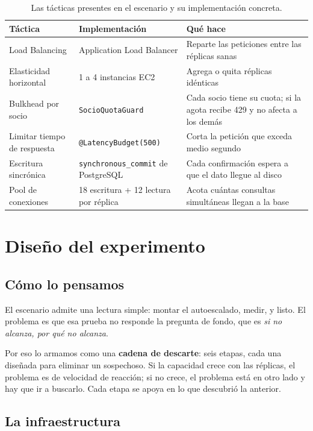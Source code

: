 \documentclass[11pt]{article}
\begin{document}
\begin{table}[H]
\centering
\begin{tabular}{L{3.6cm} L{5.2cm} L{7cm}}
\toprule
Táctica & Implementación & Qué hace \\
\midrule
Load Balancing & Application Load Balancer & Reparte las peticiones entre las réplicas sanas \\
Elasticidad horizontal & 1 a 4 instancias EC2 & Agrega o quita réplicas idénticas \\
Bulkhead por socio & \texttt{SocioQuotaGuard} & Cada socio tiene su cuota; si la agota recibe 429 y no afecta a los demás \\
Limitar tiempo de respuesta & \texttt{@LatencyBudget(500)} & Corta la petición que exceda medio segundo \\
Escritura sincrónica & \texttt{synchronous\_commit} de PostgreSQL & Cada confirmación espera a que el dato llegue al disco \\
Pool de conexiones & 18 escritura + 12 lectura por réplica & Acota cuántas consultas simultáneas llegan a la base \\
\bottomrule
\end{tabular}
\caption{Las tácticas presentes en el escenario y su implementación concreta.}
\end{table}

\section{Diseño del experimento}

\subsection{Cómo lo pensamos}

El escenario admite una lectura simple: montar el autoescalado, medir, y listo. El problema es que
esa prueba no responde la pregunta de fondo, que es \textit{si no alcanza, por qué no alcanza}.

Por eso lo armamos como una \textbf{cadena de descarte}: seis etapas, cada una diseñada para
eliminar un sospechoso. Si la capacidad crece con las réplicas, el problema es de velocidad de
reacción; si no crece, el problema está en otro lado y hay que ir a buscarlo. Cada etapa se apoya en
lo que descubrió la anterior.

\subsection{La infraestructura}
\end{document}
